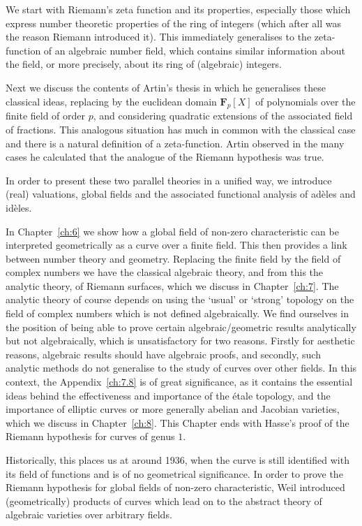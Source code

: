 \documentclass[10pt,leqno]{article}
\theoremstyle{definition}
\def\FF{\mathbf{F}}
\def\qw#1{`#1'}
\begin{document}
We start with Riemann's zeta function and its properties, especially those which express number theoretic properties of the ring of integers (which after all was the reason Riemann introduced it).
This immediately generalises to the zeta-function of an algebraic number field, which contains similar information about the field, or more precisely, about its ring of (algebraic) integers.

Next we discuss the contents of Artin's thesis in which he generalises these classical ideas, replacing by the euclidean domain $\FF_p[X]$ of polynomials over the finite field of order $p$, and considering quadratic extensions of the associated field of fractions.
This analogous situation has much in common with the classical case and there is a natural definition of a zeta-function.
Artin observed in the many cases he calculated that the analogue of the Riemann hypothesis was true.

In order to present these two parallel theories in a unified way, we introduce (real) valuations, global fields and the associated functional analysis of ad\`eles and id\`eles.

In Chapter~\ref{ch:6} we show how a global field of non-zero characteristic can be interpreted geometrically as a curve over a finite field.
This then provides a link between number theory and geometry.
Replacing the finite field by the field of complex numbers we have the classical algebraic theory, and from this the analytic theory, of Riemann surfaces, which we discuss in Chapter~\ref{ch:7}.
The analytic theory of course depends on using the \qw{usual} or \qw{strong} topology on the field of complex numbers which is not defined algebraically.
We find ourselves in the position of being able to prove certain algebraic/geometric results analytically but not algebraically, which is unsatisfactory for two reasons.
Firstly for aesthetic reasons, algebraic results should have algebraic proofs, and secondly, such analytic methods do not generalise to the study of curves over other fields.
In this context, the Appendix~\ref{ch:7.8} is of great significance, as it contains the essential ideas behind the effectiveness and importance of the \'etale topology, and the importance of elliptic curves or more generally abelian and Jacobian varieties, which we discuss in Chapter~\ref{ch:8}.
This Chapter ends with Hasse's proof of the Riemann hypothesis for curves of genus $1$.

Historically, this places us at around 1936, when the curve is still identified with its field of functions and is of no geometrical significance.
In order to prove the Riemann hypothesis for global fields of non-zero characteristic, Weil introduced (geometrically) products of curves which lead on to the abstract theory of algebraic varieties over arbitrary fields.
\end{document}

